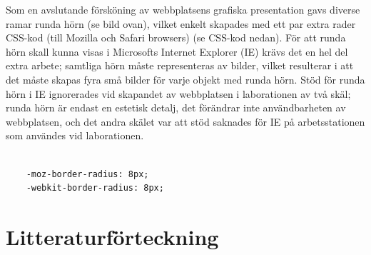 \documentclass[a4paper,10pt]{article}
\begin{document}
Som en avslutande försköning av webbplatsens grafiska presentation gavs diverse ramar runda hörn (se bild ovan), vilket enkelt skapades med ett par extra rader CSS-kod (till Mozilla och Safari browsers) (se CSS-kod nedan). För att runda hörn skall kunna visas i Microsofts Internet Explorer (IE) krävs det en hel del extra arbete; samtliga hörn måste representeras av bilder, vilket resulterar i att det måste skapas fyra små bilder för varje objekt med runda hörn. Stöd för runda hörn i IE ignorerades vid skapandet av webbplatsen i laborationen av två skäl; runda hörn är endast en estetisk detalj, det förändrar inte användbarheten av webbplatsen, och det andra skälet var att stöd saknades för IE på arbetsstationen som användes vid laborationen. \\
\\
\begin{verbatim}
    -moz-border-radius: 8px;
    -webkit-border-radius: 8px;
\end{verbatim}

\newpage

\section{Litteraturförteckning}
\end{document}
